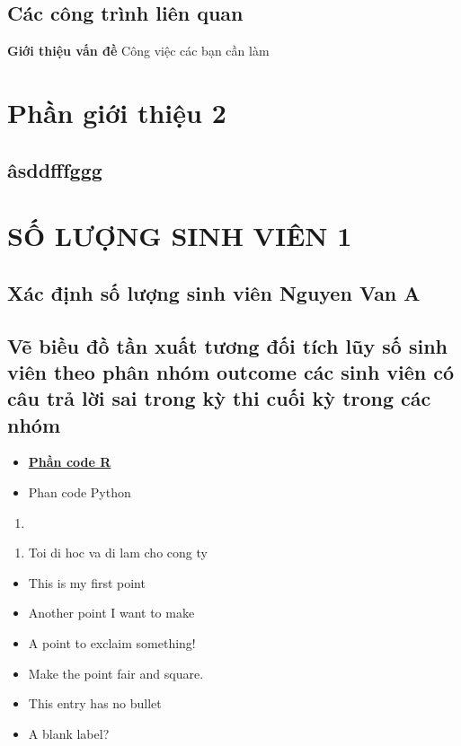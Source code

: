 \documentclass[a4paper]{article}
\begin{document}
	\subsection{Các công trình liên quan}
	\textbf{ Giới thiệu vấn đề}
	Công việc các bạn cần làm

 \section{Phần giới thiệu 2}
    \subsection{âsddfffggg}
\newpage
\section{SỐ LƯỢNG SINH VIÊN 1}
\subsection{Xác định số lượng sinh viên Nguyen Van A}
\newpage
\subsection{Vẽ biều đồ tần xuất tương đối tích lũy số sinh viên theo phân nhóm outcome các sinh viên có câu trả lời sai trong kỳ thi cuối kỳ trong các nhóm}
\begin{itemize}
    \item \large\bfseries\underline {Phần code R}
    \item Phan code Python
\end{itemize}
\begin{enumerate}
    \item
\end{enumerate}
\begin{enumerate}
    \item Toi di hoc va {\color{red}di lam cho cong } ty
\end{enumerate}
\begin{itemize}
  \item This is my first point
  \item Another point I want to make
  \item[!] A point to exclaim something!
  \item[$\blacksquare$] Make the point fair and square.
  \item[NOTE] This entry has no bullet
  \item[] A blank label?
\end{itemize}
\newpage
\end{document}
